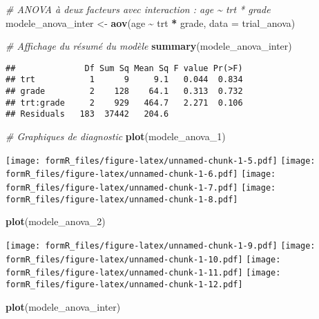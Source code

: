 \documentclass[
]{article}
\newenvironment{Shaded}{\begin{snugshade}}{\end{snugshade}}
\newcommand{\AttributeTok}[1]{\textcolor[rgb]{0.13,0.29,0.53}{#1}}
\newcommand{\CommentTok}[1]{\textcolor[rgb]{0.56,0.35,0.01}{\textit{#1}}}
\newcommand{\FunctionTok}[1]{\textcolor[rgb]{0.13,0.29,0.53}{\textbf{#1}}}
\newcommand{\NormalTok}[1]{#1}
\newcommand{\OtherTok}[1]{\textcolor[rgb]{0.56,0.35,0.01}{#1}}
\newcommand{\SpecialCharTok}[1]{\textcolor[rgb]{0.81,0.36,0.00}{\textbf{#1}}}
\begin{document}
\begin{Shaded}
\begin{Highlighting}[]
\CommentTok{\# ANOVA à deux facteurs avec interaction : age \textasciitilde{} trt * grade}
\NormalTok{modele\_anova\_inter }\OtherTok{\textless{}{-}} \FunctionTok{aov}\NormalTok{(age }\SpecialCharTok{\textasciitilde{}}\NormalTok{ trt }\SpecialCharTok{*}\NormalTok{ grade, }\AttributeTok{data =}\NormalTok{ trial\_anova)}

\CommentTok{\# Affichage du résumé du modèle}
\FunctionTok{summary}\NormalTok{(modele\_anova\_inter)}
\end{Highlighting}
\end{Shaded}

\begin{verbatim}
##              Df Sum Sq Mean Sq F value Pr(>F)
## trt           1      9     9.1   0.044  0.834
## grade         2    128    64.1   0.313  0.732
## trt:grade     2    929   464.7   2.271  0.106
## Residuals   183  37442   204.6
\end{verbatim}

\begin{Shaded}
\begin{Highlighting}[]
\CommentTok{\# Graphiques de diagnostic}
\FunctionTok{plot}\NormalTok{(modele\_anova\_1)}
\end{Highlighting}
\end{Shaded}

\texttt{[image: formR\_files/figure-latex/unnamed-chunk-1-5.pdf]}
\texttt{[image: formR\_files/figure-latex/unnamed-chunk-1-6.pdf]}
\texttt{[image: formR\_files/figure-latex/unnamed-chunk-1-7.pdf]}
\texttt{[image: formR\_files/figure-latex/unnamed-chunk-1-8.pdf]}

\begin{Shaded}
\begin{Highlighting}[]
\FunctionTok{plot}\NormalTok{(modele\_anova\_2)}
\end{Highlighting}
\end{Shaded}

\texttt{[image: formR\_files/figure-latex/unnamed-chunk-1-9.pdf]}
\texttt{[image: formR\_files/figure-latex/unnamed-chunk-1-10.pdf]}
\texttt{[image: formR\_files/figure-latex/unnamed-chunk-1-11.pdf]}
\texttt{[image: formR\_files/figure-latex/unnamed-chunk-1-12.pdf]}

\begin{Shaded}
\begin{Highlighting}[]
\FunctionTok{plot}\NormalTok{(modele\_anova\_inter)}
\end{Highlighting}
\end{Shaded}
\end{document}
